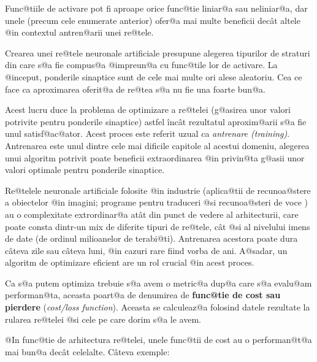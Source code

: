 Func@tiile de activare pot fi aproape orice func@tie liniar@a sau neliniar@a, dar unele  (precum cele enumerate anterior) ofer@a mai multe beneficii dec\^ at altele @in contextul antren@arii unei re@tele.

Crearea unei re@tele neuronale artificiale presupune alegerea tipurilor de straturi din care s@a fie compus@a @impreun@a cu func@tile lor de activare. La @inceput, ponderile sinaptice sunt de cele mai multe ori alese aleatoriu. Cea ce face ca aproximarea oferit@a de re@tea s@a nu fie una foarte bun@a.

Acest lucru duce la problema de optimizare a re@telei (g@asirea unor valori potrivite pentru ponderile sinaptice) astfel \^inc\^ at rezultatul aproxim@arii s@a fie unul satisf@ac@ator. Acest proces este referit uzual ca {\sl antrenare (training)}. Antrenarea este unul dintre cele mai dificile capitole al acestui domeniu, alegerea unui algoritm potrivit poate beneficii extraordinarea @in privin@ta g@asii unor valori optimale pentru ponderile sinaptice.

Re@telele neuronale artificiale folosite @in industrie (aplica@tii de recunoa@stere a obiectelor @in imagini; programe pentru traduceri @si recunoa@steri de voce ) au o complexitate extrordinar@a at\^ at din punct de vedere al arhitecturii, care poate consta dintr-un mix de diferite tipuri de re@tele, c\^ at @si al nivelului imens de date (de ordinul milioanelor de terabi@ti). Antrenarea acestora poate dura c\^ ateva zile sau c\^ ateva luni, @in cazuri rare fiind vorba de ani. A@sadar, un algoritm de optimizare eficient are un rol crucial @in acest proces.

Ca s@a putem optimiza trebuie s@a avem o metric@a dup@a care s@a evalu@am performan@ta, aceasta poart@a de denumirea de \textbf{func@tie de cost sau pierdere} (\textsl{cost/loss function}). Aceasta se calculeaz@a folosind datele rezultate la rularea re@telei @si cele pe care dorim s@a le avem. 

@In func@tie de arhitectura re@telei, unele func@tii de cost au o performan@t@a mai bun@a dec\^ at celelalte. C\^ ateva exemple:

